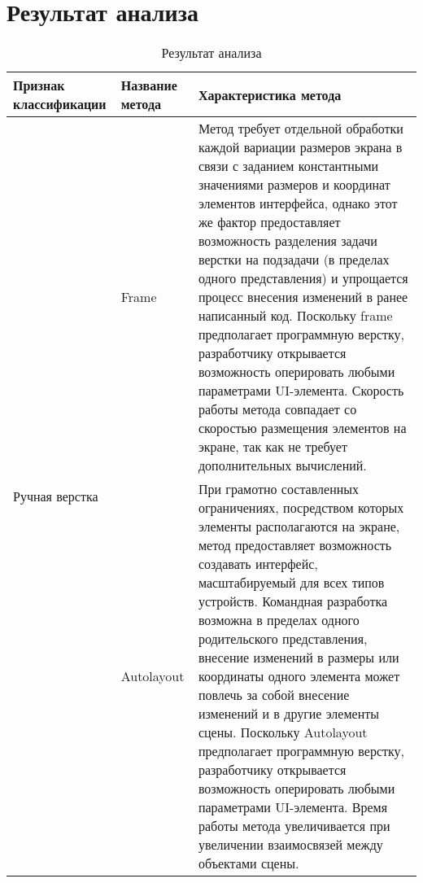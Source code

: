 \chapter{Результат анализа}

\begin{table}[H]
	\centering
	\caption{Результат анализа}
	\label{mko_table_0}
	\begin{tabular}{|p{3.3cm}|p{2.9cm}|p{9.5cm}|}
		\hline
		\textbf{Признак классификации} & \textbf{Название метода} & \textbf{Характеристика метода} \\
		\hline
		\multirow{2}{2.9cm}{Ручная верстка} & 
		Frame & 
		Метод требует отдельной обработки каждой вариации размеров экрана в связи с заданием константными значениями размеров и 
		координат элементов интерфейса, однако этот же фактор предоставляет возможность разделения задачи верстки на подзадачи (в 
		пределах одного представления) и упрощается процесс внесения изменений в ранее написанный код. Поскольку frame предполагает
		программную верстку, разработчику открывается возможность оперировать любыми параметрами UI-элемента. Скорость работы 
		метода совпадает со скоростью размещения элементов на экране, так как не требует дополнительных вычислений.\\
		\hline
		
		\multirow{2}{2.9cm}{Автомати- верстка} & 
		Autolayout & 
		При грамотно составленных ограничениях, посредством которых элементы располагаются на экране, метод предоставляет 
		возможность создавать интерфейс, масштабируемый для всех типов устройств. Командная разработка возможна в пределах одного 
		родительского представления, внесение изменений в размеры или координаты одного элемента может повлечь за собой внесение 
		изменений и в другие элементы сцены. Поскольку Autolayout предполагает программную верстку, разработчику открывается 
		возможность оперировать любыми параметрами UI-элемента. Время работы метода увеличивается при увеличении взаимосвязей
		между объектами сцены.\\
		\hline
	\end{tabular}
\end{table}

